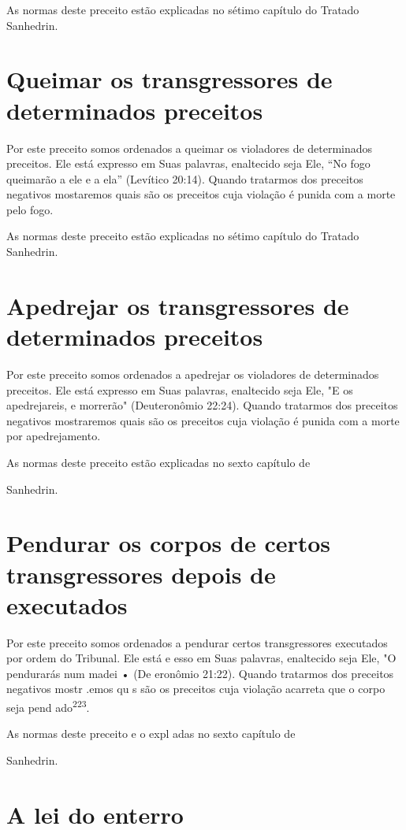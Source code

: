 As normas deste preceito estão explicadas no sétimo capítulo do Tra­tado
Sanhedrin.

\section{Queimar os transgressores de determinados preceitos}

Por este preceito somos ordenados a queimar os violadores de
de­terminados preceitos. Ele está expresso em Suas palavras, enaltecido
seja Ele, ``No fogo queimarão a ele e a ela'' (Levítico 20:14). Quando
tratarmos dos pre­ceitos negativos mostaremos quais são os preceitos
cuja violação é punida com a morte pelo fogo.

As normas deste preceito estão explicadas no sétimo capítulo do Tra­tado
Sanhedrin.

\section{Apedrejar os transgressores de determinados preceitos}

Por este preceito somos ordenados a apedrejar os violadores de
de­terminados preceitos. Ele está expresso em Suas palavras, enaltecido
seja Ele, "E os apedrejareis, e morrerão" (Deuteronômio 22:24). Quando
tratarmos dos preceitos negativos mostraremos quais são os preceitos
cuja violação é punida com a morte por apedrejamento.


As normas deste preceito estão explicadas no sexto capítulo de


Sanhedrin.



\section{Pendurar os corpos de certos transgressores depois de executados}

Por este preceito somos ordenados a pendurar certos transgressores
executados por ordem do Tribunal. Ele está e esso em Suas palavras,
enalte­cido seja Ele, "O pendurarás num madei • (De eronômio 21:22).
Quando tratarmos dos preceitos negativos mostr .emos
qu s são os preceitos cuja vio­lação acarreta que o corpo seja pend
ado\textsuperscript{223}.


As normas deste preceito e o expl adas no sexto capítulo de


Sanhedrin.

\section{A lei do enterro}

